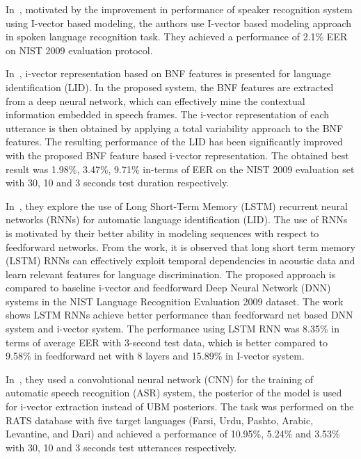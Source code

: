 \begin{spacing}{1.5}
In~\cite{dehak2011language}, motivated by the improvement in performance of speaker recognition system using I-vector based modeling, the authors use I-vector based modeling approach in spoken language recognition task. They achieved a performance of 2.1\% EER on NIST 2009 evaluation protocol.

In~\cite{song2013vector}, i-vector representation based on BNF features is presented for language identification (LID). In the proposed system, the BNF features are extracted from a deep neural network, which can effectively mine the contextual information embedded in speech frames. The i-vector representation of each utterance is then obtained by applying a total variability approach to the BNF features. The resulting performance of the LID has been significantly improved with the proposed BNF feature based i-vector representation. The obtained best result was 1.98\%, 3.47\%, 9.71\% in-terms of EER  on the NIST 2009 evaluation set with 30, 10 and 3 seconds test duration respectively.

In~\cite{gonzalez2014automatic}, they explore the use of Long Short-Term Memory (LSTM) recurrent neural networks (RNNs) for automatic language identification (LID). The use of RNNs is motivated by their better ability in modeling sequences with respect to feedforward networks. From the work, it is observed that long short term memory (LSTM) RNNs can effectively exploit temporal dependencies in acoustic data and learn relevant features for language discrimination. The proposed approach is compared to baseline i-vector and feedforward Deep Neural Network (DNN) systems in the NIST Language Recognition Evaluation 2009 dataset. The work shows LSTM RNNs achieve better performance than feedforward net based DNN system and i-vector system. The performance using LSTM RNN was 8.35\% in terms of average EER with 3-second test data, which is better compared to 9.58\% in feedforward net with 8 layers and 15.89\% in I-vector system. 

In~\cite{lei2014application}, they used a convolutional neural network (CNN) for the training of automatic speech recognition (ASR) system, the posterior of the model is used for i-vector extraction instead of UBM posteriors. The task was performed on the RATS database with five target languages (Farsi, Urdu, Pashto, Arabic, Levantine, and Dari) and achieved a performance of 10.95\%, 5.24\% and 3.53\% with 30, 10 and 3 seconds test utterances respectively. 


\end{spacing}
